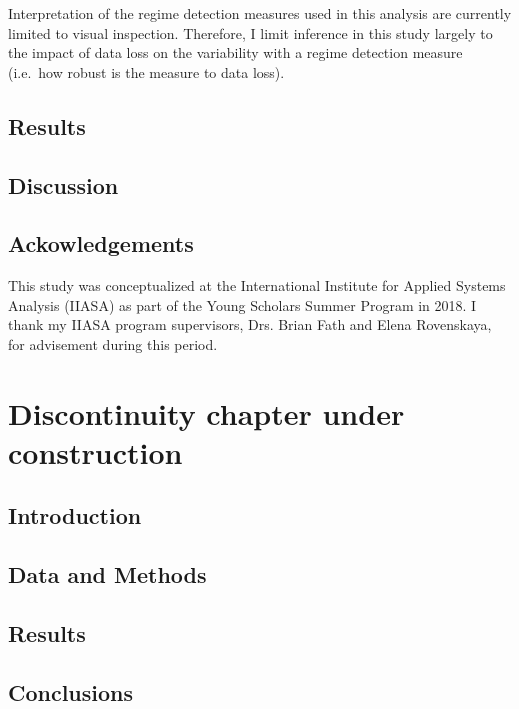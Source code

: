\documentclass[12pt,twoside,openany]{reedthesis}
\begin{document}
Interpretation of the regime detection measures used in this analysis
are currently limited to visual inspection. Therefore, I limit inference
in this study largely to the impact of data loss on the variability with
a regime detection measure (i.e.~how robust is the measure to data
loss).

\section{Results}\label{results-2}

\section{Discussion}\label{discussion-3}

\section{Ackowledgements}\label{ackowledgements}

This study was conceptualized at the International Institute for Applied
Systems Analysis (IIASA) as part of the Young Scholars Summer Program in
2018. I thank my IIASA program supervisors, Drs. Brian Fath and Elena
Rovenskaya, for advisement during this period.

\chapter{Discontinuity chapter under construction}\label{discontinuity}

\section{Introduction}\label{introduction-5}

\section{Data and Methods}\label{data-and-methods-2}

\section{Results}\label{results-3}

\section{Conclusions}\label{conclusions-1}
\end{document}
